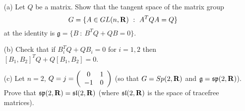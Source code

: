 \documentclass[12pt]{article}
\begin{document}
\bigskip



\begin{question}\ \\
\begin{enumerate}
\item[(a)] Let $Q$ be a matrix. Show that the tangent space of the matrix group
\[G=\{A\in GL(n,\mathbf{R})\ :\ A^TQA=Q\}\]
at the identity is $\mathfrak{g}=\{B\ :\ B^TQ+QB=0\}$.
\item[(b)] Check that if $B_i^TQ+QB_i=0$ for $i=1,2$ then $[B_1,B_2]^TQ+Q[B_1,B_2]=0$.
\item[(c)] Let $n=2$, $Q=j=\left(\begin{array}{cc}0 & 1\\ -1 & 0\end{array}\right)$ (so that $G=Sp(2,\mathbf{R})$ and $\mathfrak{g}=\mathfrak{sp}(2,\mathbf{R})$). Prove that $\mathfrak{sp}(2,\RR)=\mathfrak{sl}(2,\RR)$ (where $\mathfrak{sl}(2,\mathbf{R})$ is the space of tracefree matrices).
\end{enumerate}
\end{question}

\iffalse
\begin{answer}
\begin{enumerate}[(a)]
If $A(t)$ is a path in $G$ (with $A(0)=1$ and $\dot{A}(0)=B$) then $A(t)^TQA(t)=Q$, so differentiating at $t=0$ gives
\[B^TQ+QB=0.\]
Conversely, if $B$ satisfies $B^TQ+QB=0$ then consider $R(t)=\exp(tB)^TQ\exp(tB)=\exp(tB^T)Q\exp(tB)$. We have $R(0)=Q$ and $\dot{R}(t)=\exp(tB^T)B^TQ\exp(tB)+\exp(tB^T)QB\exp(tB)$. Therefore
\[\dot{R}(t)=\exp(tB^T)(B^TQ+QB)\exp(tB)=0\]
and so $R(t)=R(0)=Q$. Therefore $\exp(tB)$ is a path in $G$ with tangent vector $B$ at the origin. This proves that $\mathfrak{g}=\{B\ :\ B^TQ+QB=0\}$ is the tangent space of $G$ at $1$.
\item We have
\begin{align*}
[B_1,B_2]^TQ+Q[B_1,B_2]&=(B^T_2B^T_1-B^T_1B^T_2)Q+QB_1B_2-QB_2B_1\\
                      &=-B^T_2QB_1+B^T_1QB_2-B^T_1QB_2+B^T_2QB_1
\end{align*}
(using $B_i^TQ=-QB_i$) and these cancel.
\item If $B^Tj=-jB$ and $B=\matr{a}{b}{c}{d}$ then
\[B^Tj=\matr{-c}{a}{-d}{b},\quad -jB=\matr{-c}{-d}{a}{b}\]
so $a=-d$ is the only condition. This is the same as $\OP{Tr}(B)=0$ so $\mathfrak{sp}(2,\RR)=\mathfrak{sl}(2,\RR)$.
\end{enumerate}
\end{answer}
\newpage
\fi

\bigskip
\end{document}

